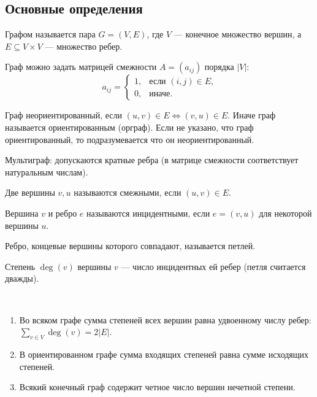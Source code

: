 \subsection{Основные определения}

\begin{defn}
    Графом называется пара $G = (V, E)$, где $V$ --- конечное множество вершин, а $E \subseteq V \times V$ --- множество ребер.
\end{defn}

\begin{defn}
    Граф можно задать матрицей смежности $A = (a_{ij})$ порядка $|V|$:
    \[ 
        a_{ij} = \begin{cases}
            1, & \text{если $(i, j) \in E$,}\\
            0, & \text{иначе.}
        \end{cases}
    \]
\end{defn}

\begin{defn}
    Граф неориентированный, если $(u, v) \in E \iff (v, u) \in E$. Иначе граф называется ориентированным (орграф). Если не указано, что граф ориентированный, то подразумевается что он неориентированный.
\end{defn}

\begin{defn}
    Мультиграф: допускаются кратные ребра (в матрице смежности соответствует натуральным числам).
\end{defn}

\begin{defn}
    Две вершины $v, u$ называются смежными, если $(u, v) \in E$.
\end{defn}

\begin{defn}
    Вершина $v$ и ребро $e$ называются инцидентными, если $e = (v, u)$ для некоторой вершины $u$.
\end{defn}

\begin{defn}
    Ребро, концевые вершины которого совпадают, называется петлей.
\end{defn}

\begin{defn}
    Степень $\deg(v)$ вершины $v$ --- число инцидентных ей ребер (петля считается дважды).
\end{defn}

\begin{lemma} ~

    \begin{enumerate}
        \item Во всяком графе сумма степеней всех вершин равна удвоенному числу ребер: $\sum\limits_{v \in V} \deg(v) = 2|E|$.
        
        \item В ориентированном графе сумма входящих степеней равна сумме исходящих степеней.
        
        \item Всякий конечный граф содержит четное число вершин нечетной степени.
    \end{enumerate}

\end{lemma}

